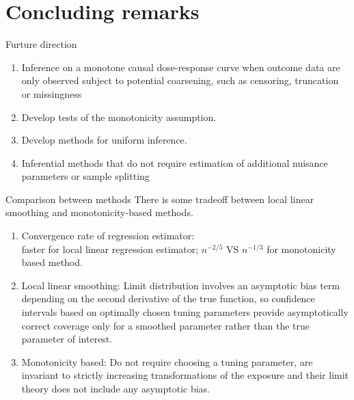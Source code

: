 \documentclass{beamer}
\begin{document}
\section{Concluding remarks}
\begin{frame}{Furture direction}
	\begin{enumerate}
		\item Inference on a monotone causal dose-response curve when outcome data are only observed subject to potential coarsening, such as censoring, truncation or
		missingness

		\item Develop tests of the monotonicity assumption.

		\item Develop methods for uniform inference.

		\item Inferential methods that do not require estimation of additional nuisance parameters or sample splitting
	\end{enumerate}
\end{frame}

\begin{frame}{Comparison between methods}
There is some tradeoff between local linear smoothing and monotonicity-based methods.
\begin{enumerate}
	\item Convergence rate of regression estimator:\\
	faster for local linear regression estimator; $n^{-2/5}$ VS $n^{-1/3}$ for monotonicity based method.

	\item Local linear smoothing: Limit distribution
	involves an asymptotic bias term depending on the second derivative of the true function,
	so confidence intervals based on optimally chosen tuning parameters provide asymptotically
	correct coverage only for a smoothed parameter rather than the true parameter of interest.

	\item Monotonicity based: Do not require choosing a tuning parameter, are invariant to strictly
	increasing transformations of the exposure and their limit theory does not include any asymptotic
	bias.
\end{enumerate}
\end{frame}
\end{document}
